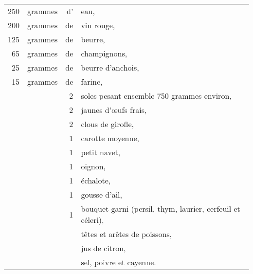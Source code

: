 \footnotesize
\begin{longtable}{rrrp{16em}}
    250 & grammes & d' & eau,                                                                             \\
    200 & grammes & de & vin rouge,                                                                       \\
    125 & grammes & de & beurre,                                                                          \\
     65 & grammes & de & champignons,                                                                     \\
     25 & grammes & de & beurre d'anchois,                                                                \\
     15 & grammes & de & farine,                                                                          \\
        &         &  2 & soles pesant ensemble 750 grammes environ,                                       \\
        &         &  2 & jaunes d'œufs frais,                                                             \\
        &         &  2 & clous de girofle,                                                                \\
        &         &  1 & carotte moyenne,                                                                 \\
        &         &  1 & petit navet,                                                                     \\
        &         &  1 & oignon,                                                                          \\
        &         &  1 & échalote,                                                                        \\
        &         &  1 & gousse d'ail,                                                                    \\
        &         &  1 & bouquet garni (persil, thym, laurier, cerfeuil et céleri),                       \\
        &         &    & têtes et arêtes de poissons,                                                     \\
        &         &    & jus de citron,                                                                   \\
        &         &    & sel, poivre et cayenne.                                                          \\
\end{longtable}
\normalsize


